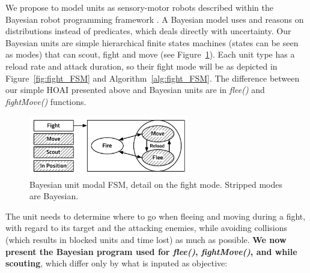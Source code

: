 We propose to model units as sensory-motor robots described within the Bayesian robot programming framework \citep{Lebeltel04}. A Bayesian model uses and reasons on distributions instead of predicates, which deals directly with uncertainty. %
Our Bayesian units are simple hierarchical finite states machines (states can be seen as modes) that can scout, fight and move (see Figure~\ref{fig:unit_HFSM}). Each unit type has a reload rate and attack duration, so their fight mode will be as depicted in Figure~\ref{fig:fight_FSM} and Algorithm~\ref{alg:fight_FSM}. The difference between our simple HOAI presented above and Bayesian units are in \textit{flee()} and \textit{fightMove()} functions.
\begin{figure}[h]
\begin{center}
\includegraphics[width=7cm]{images/unit_HFSM2.pdf}
\end{center}
\caption{Bayesian unit modal FSM, detail on the fight mode. Stripped modes are Bayesian.}
\label{fig:unit_HFSM}
\end{figure}

The unit needs to determine where to go when fleeing and moving during a fight, with regard to its target and the attacking enemies, while avoiding collisions (which results in blocked units and time lost) as much as possible. \textbf{We now present the Bayesian program used for \textit{flee()}, \textit{fightMove()}, and while scouting}, which differ only by what is inputed as objective:
